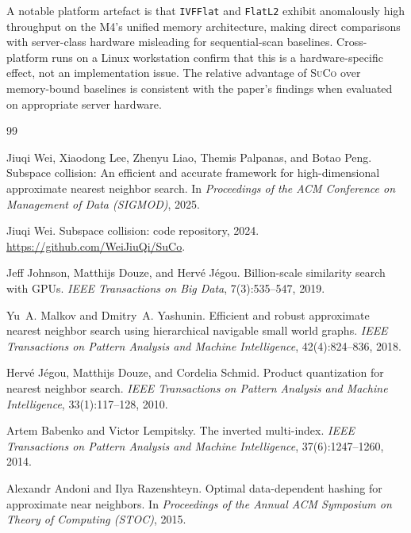 \documentclass[11pt,a4paper]{article}
\newcommand{\suco}{\textsc{SuCo}}
\begin{document}
A notable platform artefact is that \texttt{IVFFlat} and \texttt{FlatL2}
exhibit anomalously high throughput on the M4's unified memory architecture,
making direct comparisons with server-class hardware misleading for
sequential-scan baselines.  Cross-platform runs on a Linux workstation
confirm that this is a hardware-specific effect, not an implementation issue.
The relative advantage of \suco{} over memory-bound baselines is consistent
with the paper's findings when evaluated on appropriate server hardware.


\begin{thebibliography}{99}

Jiuqi Wei, Xiaodong Lee, Zhenyu Liao, Themis Palpanas, and Botao Peng.
\newblock Subspace collision: An efficient and accurate framework for
  high-dimensional approximate nearest neighbor search.
\newblock In \emph{Proceedings of the ACM Conference on Management of Data
  (SIGMOD)}, 2025.

Jiuqi Wei.
\newblock Subspace collision: code repository, 2024.
\newblock \url{https://github.com/WeiJiuQi/SuCo}.

Jeff Johnson, Matthijs Douze, and Herv{\'e} J{\'e}gou.
\newblock Billion-scale similarity search with {GPUs}.
\newblock \emph{IEEE Transactions on Big Data}, 7(3):535--547, 2019.

Yu~A. Malkov and Dmitry~A. Yashunin.
\newblock Efficient and robust approximate nearest neighbor search using
  hierarchical navigable small world graphs.
\newblock \emph{IEEE Transactions on Pattern Analysis and Machine
  Intelligence}, 42(4):824--836, 2018.

Herv{\'e} J{\'e}gou, Matthijs Douze, and Cordelia Schmid.
\newblock Product quantization for nearest neighbor search.
\newblock \emph{IEEE Transactions on Pattern Analysis and Machine
  Intelligence}, 33(1):117--128, 2010.

Artem Babenko and Victor Lempitsky.
\newblock The inverted multi-index.
\newblock \emph{IEEE Transactions on Pattern Analysis and Machine
  Intelligence}, 37(6):1247--1260, 2014.

Alexandr Andoni and Ilya Razenshteyn.
\newblock Optimal data-dependent hashing for approximate near neighbors.
\newblock In \emph{Proceedings of the Annual ACM Symposium on Theory of
  Computing (STOC)}, 2015.


\end{thebibliography}
\end{document}
